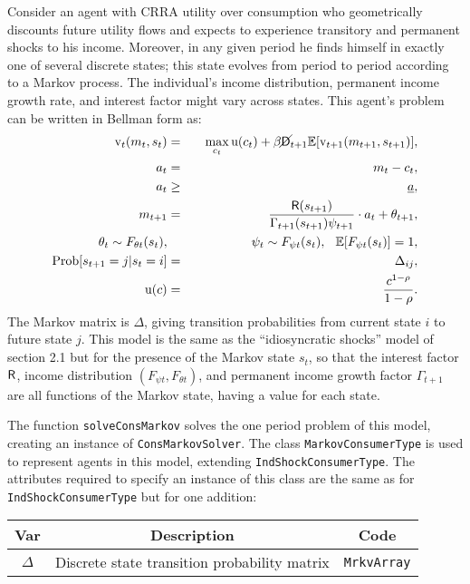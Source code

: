 \documentclass[12pt,titlepage,letterpaper]{econtex}
\newcommand{\E}{\mathbb{E}}
\begin{document}
Consider an agent with CRRA utility over consumption who geometrically discounts future utility flows and expects to experience transitory and permanent shocks to his income.  Moreover, in any given period he finds himself in exactly one of several discrete states; this state evolves from period to period according to a Markov process.  The individual's income distribution, permanent income growth rate, and interest factor might vary across states.  This agent's problem can be written in Bellman form as:
\begin{eqnarray*}
\vFunc_t(m_t,s_t) &=& \max_{c_t} \utilFunc(c_t) + \beta \PLives_{t+1} \E [\vFunc_{t+1}(m_{t+1},s_{t+1}) ], \\
a_t &=& m_t - c_t, \\
a_t &\geq& \underline{a}, \\
m_{t+1} &=& \frac{\Rfree(s_{t+1})}{\Gamma_{t+1}(s_{t+1})\psi_{t+1}} \cdot a_t + \theta_{t+1}, \\
\theta_t \sim F_{\theta t}(s_{t}), &\qquad& \psi_t \sim F_{\psi t}(s_{t}), \hspace{0.25cm} \E[F_{\psi t}(s_{t})] = 1, \\
\text{Prob}[s_{t+1}=j | s_t=i] &=& \Delta_{ij}, \\
\utilFunc(c) &=& \frac{c^{1-\CRRA}}{1-\CRRA}.
\end{eqnarray*}
The Markov matrix is $\Delta$, giving transition probabilities from current state $i$ to future state $j$.  This model is the same as the ``idiosyncratic shocks'' model of section 2.1 but for the presence of the Markov state $s_t$, so that the interest factor $\mathsf{R}$, income distribution $(F_{\psi t},F_{\theta t})$, and permanent income growth factor $\Gamma_{t+1}$ are all functions of the Markov state, having a value for each state.

The function \texttt{solveConsMarkov} solves the one period problem of this model, creating an instance of \texttt{ConsMarkovSolver}.  The class \texttt{MarkovConsumerType} is used to represent agents in this model, extending \texttt{IndShockConsumerType}.  The attributes required to specify an instance of this class are the same as for \texttt{IndShockConsumerType} but for one addition:

\begin{table}[h!]
\centering
\begin{tabular}{c c c}
Var & Description & Code \\
\hline
$\Delta$ & Discrete state transition probability matrix & \texttt{MrkvArray}
\end{tabular}
\end{table}
\end{document}
